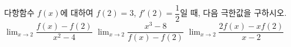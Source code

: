 다항함수 $f(x)$에 대하여 $f(2)=3$, $f'(2)=\dfrac{1}{2}$일 때, 다음 극한값을 구하시오.
 $\displaystyle\lim_{x\to 2}\dfrac{f(x)-f(2)}{x^2-4}$
 $\displaystyle\lim_{x\to 2}\dfrac{x^3-8}{f(x)-f(2)}$
 $\displaystyle\lim_{x\to 2}\dfrac{2f(x)-xf(2)}{x-2}$
